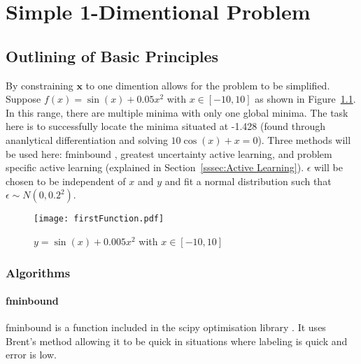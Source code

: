 
\chapter{Simple 1-Dimentional Problem}

\ifpdf
    \graphicspath{{Chapter2/Figs/Raster/}{Chapter2/Figs/PDF/}{Chapter2/Figs/}}
\else
    \graphicspath{{Chapter2/Figs/Vector/}{Chapter2/Figs/}}
\fi


\section{Outlining of Basic Principles}

By constraining $\bm{x}$ to one dimention allows for the problem to be simplified. Suppose ${f(x)=\sin(x)+0.05x^2}$ with ${x\in [-10, 10]}$ as shown in Figure~\ref{fig:firstFunction}. In this range, there are multiple minima with only one global minima. The task here is to successfully locate the minima situated at -1.428 (found through ananlytical differentiation and solving ${10\cos(x)+x=0}$). Three methods will be used here: $\text{fminbound}$ \cite{2020SciPy-NMeth}, greatest uncertainty active learning, and problem specific active learning (explained in Section~\ref{sssec:Active Learning}). $\epsilon$ will be chosen to be independent of $x$ and $y$ and fit a normal distribution such that ${\epsilon\sim N(0, 0.2^2)}$.

\begin{figure}[htbp!] 
\centering    
\texttt{[image: firstFunction.pdf]}
\caption[First Function]{$y = \sin(x) + 0.005x^2$ with $x\in [-10, 10]$}
\label{fig:firstFunction}
\end{figure}

\subsection{Algorithms}
\label{ssec: algorithms}
\subsubsection{fminbound}
fminbound is a function included in the scipy optimisation library \cite{2020SciPy-NMeth}. It uses Brent's method allowing it to be quick in situations where labeling is quick and error is low.

